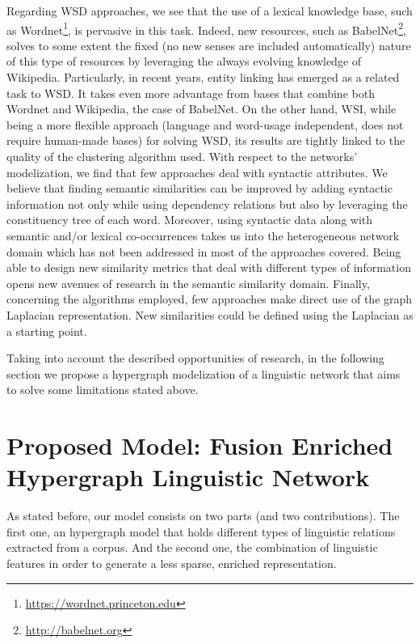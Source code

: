 Regarding WSD approaches, we see that the use of a lexical knowledge base, such as Wordnet\footnote{\url{https://wordnet.princeton.edu}}, is pervasive in this task. Indeed, new resources, such as BabelNet\footnote{\url{http://babelnet.org}}, solves to some extent the fixed (no new senses are included automatically) nature of this type of resources by leveraging the always evolving knowledge of Wikipedia. Particularly, in  recent years, entity linking has emerged as a related task to WSD. It takes even more advantage from bases that combine both Wordnet and Wikipedia, the case of BabelNet. On the other hand, WSI, while being a more flexible approach (language and word-usage independent, does not require human-made bases)  for solving WSD, its results are tightly linked to the quality of the clustering algorithm used. 
% 
 With respect to the networks' modelization, we find that few approaches deal with syntactic attributes. We believe that finding semantic similarities can be improved by adding syntactic information not only  while using dependency relations but also by leveraging the constituency tree of each word. Moreover, using syntactic data along with semantic and/or lexical co-occurrences takes us into the heterogeneous network domain which has not been addressed in most of the approaches covered. Being able to design new similarity metrics that deal with different types of information opens new avenues of research in the semantic similarity domain. Finally, concerning the algorithms employed, few approaches make direct use of the graph Laplacian representation. New similarities could be defined using the Laplacian as a starting point. 


Taking into account the described opportunities of research, in the following section we propose a  hypergraph modelization of a linguistic network that aims to solve some limitations stated above. 


 
\section{Proposed Model: Fusion Enriched Hypergraph Linguistic Network}
\label{sec:enriched_hypergraph}

As stated before, our model consists on two parts (and two contributions). The first one, an hypergraph model that holds different types of linguistic relations extracted from a corpus. And the second one, the combination of linguistic features in order to generate a less sparse, enriched representation. 

